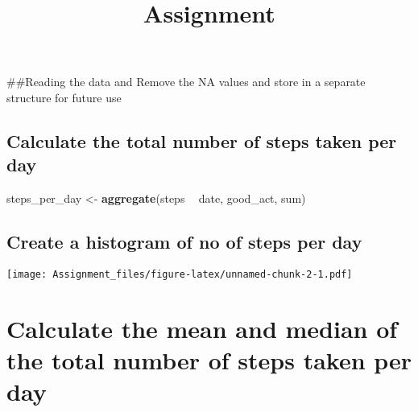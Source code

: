 \documentclass[
]{article}
\title{Assignment}
\author{}
\date{\vspace{-2.5em}}
\newenvironment{Shaded}{\begin{snugshade}}{\end{snugshade}}
\newcommand{\DataTypeTok}[1]{\textcolor[rgb]{0.13,0.29,0.53}{#1}}
\newcommand{\KeywordTok}[1]{\textcolor[rgb]{0.13,0.29,0.53}{\textbf{#1}}}
\newcommand{\NormalTok}[1]{#1}
\newcommand{\OperatorTok}[1]{\textcolor[rgb]{0.81,0.36,0.00}{\textbf{#1}}}
\newcommand{\StringTok}[1]{\textcolor[rgb]{0.31,0.60,0.02}{#1}}
\begin{document}
\maketitle

\#\#Reading the data and Remove the NA values and store in a separate
structure for future use

\hypertarget{calculate-the-total-number-of-steps-taken-per-day}{%
\subsection{Calculate the total number of steps taken per
day}\label{calculate-the-total-number-of-steps-taken-per-day}}

\begin{Shaded}
\begin{Highlighting}[]
\NormalTok{steps_per_day <-}\StringTok{ }\KeywordTok{aggregate}\NormalTok{(steps }\OperatorTok{~}\StringTok{ }\NormalTok{date, good_act, sum)}
\end{Highlighting}
\end{Shaded}

\hypertarget{create-a-histogram-of-no-of-steps-per-day}{%
\subsection{Create a histogram of no of steps per
day}\label{create-a-histogram-of-no-of-steps-per-day}}

\begin{Shaded}
\end{Shaded}

\texttt{[image: Assignment\_files/figure-latex/unnamed-chunk-2-1.pdf]}

\hypertarget{calculate-the-mean-and-median-of-the-total-number-of-steps-taken-per-day}{%
\section{Calculate the mean and median of the total number of steps
taken per
day}\label{calculate-the-mean-and-median-of-the-total-number-of-steps-taken-per-day}}

\begin{Shaded}
\end{Shaded}
\end{document}
